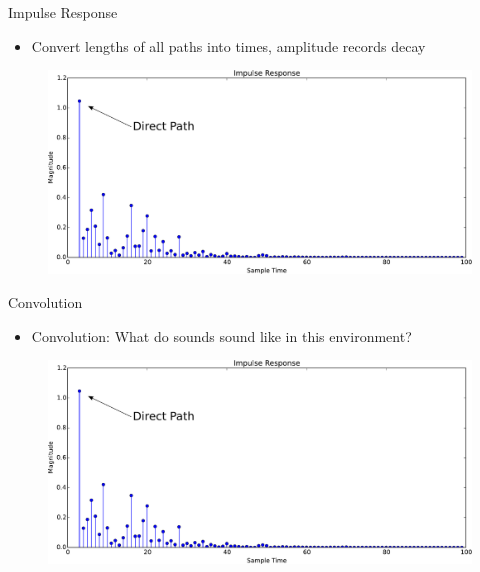 \documentclass{beamer}
\begin{document}
\begin{frame}{Impulse Response}

\begin{itemize}[label=$\vartriangleright$]
\item Convert lengths of all paths into times, amplitude records decay
\end{itemize}

\begin{figure}[t]
	\centering
    \includegraphics[width=\textwidth]{ImpulseResponse.pdf}
\end{figure}


\end{frame}


\begin{frame}{Convolution}

\begin{itemize}[label=$\vartriangleright$]
\item Convolution: What do sounds sound like in this environment?
\end{itemize}

\begin{figure}[t]
	\centering
    \includegraphics[width=\textwidth]{ImpulseResponse.pdf}
\end{figure}

\end{frame}
\end{document}
